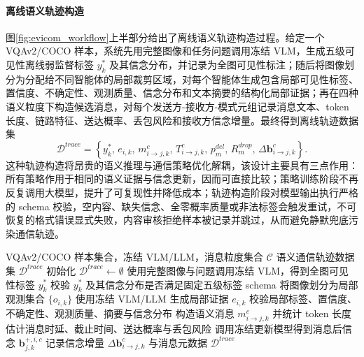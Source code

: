 \paragraph{离线语义轨迹构造}
图\ref{fig:evicom_workflow}上半部分给出了离线语义轨迹构造过程。给定一个 VQAv2/COCO 样本，系统先用完整图像和任务问题调用冻结 VLM，生成五级可见性离线弱监督标签 $y_k^{*}$ 及其信念分布，并记录为全图可见性标注；随后将图像划分为分配给不同智能体的局部裁剪区域，对每个智能体生成包含局部可见性标签、置信度、不确定性、观测质量、信念分布和文本摘要的结构化局部证据；再在四种语义粒度下构造候选消息，对每个发送方-接收方-模式元组记录消息文本、token 长度、链路特征、送达概率、丢包风险和接收方信念增量。最终得到离线轨迹数据集
\begin{equation}
\mathcal{D}^{trace}=\left\{y_k^{*},\,e_{i,k},\,m_{i\rightarrow j,k}^{c},\,T_{i\rightarrow j,k}^{c},\,p_m^{del},\,R_m^{drop},\,\Delta\mathbf{b}_{i\rightarrow j,k}^{c}\right\}.
\end{equation}
这种轨迹构造将昂贵的语义推理与通信策略优化解耦，该设计主要具有三点作用：所有策略作用于相同的语义证据与信念更新，因而可直接比较；策略训练阶段不再反复调用大模型，提升了可复现性并降低成本；轨迹构造阶段对模型输出执行严格的 schema 校验，空内容、缺失信念、全零概率质量或非法标签会触发重试，不可恢复的格式错误显式失败，内容审核拒绝样本被记录并跳过，从而避免静默兜底污染通信轨迹。

\begin{algorithm}[!htbp]
\caption{EviComRL 离线语义轨迹构造}
\label{alg:evicom_trace}
\renewcommand{\algorithmicrequire}{\textbf{输入：}}
\renewcommand{\algorithmicensure}{\textbf{输出：}}
\small
\begin{algorithmic}[1]
\REQUIRE VQAv2/COCO 样本集合，冻结 VLM/LLM，消息粒度集合 $\mathcal{C}$
\ENSURE 语义通信轨迹数据集 $\mathcal{D}^{trace}$
\STATE 初始化 $\mathcal{D}^{trace}\leftarrow\emptyset$
    \STATE 使用完整图像与问题调用冻结 VLM，得到全图可见性标签 $y_k^*$
    \STATE 校验 $y_k^*$ 及其信念分布是否满足固定五级标签 schema
    \STATE 将图像划分为局部观测集合 $\{o_{i,k}\}$
        \STATE 使用冻结 VLM/LLM 生成局部证据 $e_{i,k}$
        \STATE 校验局部标签、置信度、不确定性、观测质量、摘要与信念分布
    \ENDFOR
            \STATE 构造语义消息 $m_{i\rightarrow j,k}^{c}$ 并统计 token 长度
            \STATE 估计消息时延、截止时间、送达概率与丢包风险
            \STATE 调用冻结更新模型得到消息后信念 $\mathbf{b}_{j,k}^{+,i,c}$
            \STATE 记录信念增量 $\Delta\mathbf{b}_{i\rightarrow j,k}^{c}$ 与消息元数据
        \ENDFOR
    \ENDFOR
\ENDFOR
\RETURN $\mathcal{D}^{trace}$
\end{algorithmic}
\end{algorithm}

